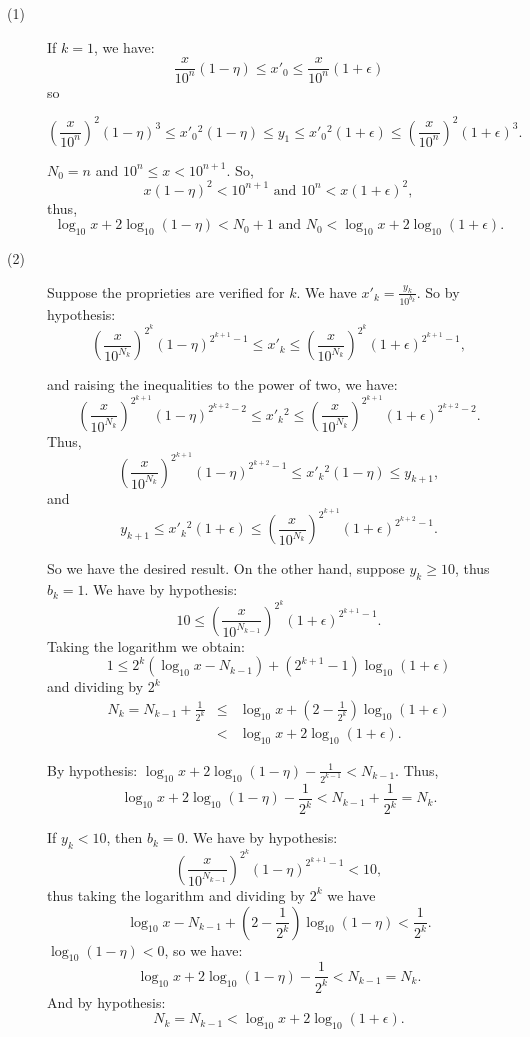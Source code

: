 \documentclass[a4paper,12pt]{article}
\begin{document}
\begin{description}
\item[(1)] If $k = 1$, we have:
\[\frac{x}{10^n}(1-\eta) \le {x'}_0 \le \frac{x}{10^n}(1 + \epsilon)\] so

\[\left(\frac{x}{10^n}\right)^2(1-\eta)^3 \le {x'}_0{}^2(1-\eta) \le y_1
\le {x'}_0{}^2(1+\epsilon)\le \left(\frac{x}{10^n}\right)^2(1+\epsilon)^3.\]

$N_0=n$ and $10^n \le x < 10^{n+1}$.  So,
\[x(1-\eta)^2 < 10^{n+1} \mbox{ and } 10^n < x(1+\epsilon)^2,\] thus,
\[\log_{10}x + 2\log_{10}(1-\eta) < N_0 + 1 \mbox{ and }
N_0 < \log_{10} x + 2 \log_{10}(1 + \epsilon).\]

\item[(2)] Suppose the proprieties are verified for $k$.  We have
${x'}_k = \frac{y_k}{10^{b_k}}$.  So by hypothesis:
\[\left(\frac{x}{10^{N_k}}\right)^{2^k}(1-\eta)^{2^{k+1}-1} \le {x'}_k \le
\left(\frac{x}{10^{N_k}}\right)^{2^k}(1+\epsilon)^{2^{k+1}-1},\]

and raising the inequalities to the power of two, we have:
\[\left(\frac{x}{10^{N_k}}\right)^{2^{k+1}}(1-\eta)^{2^{k+2}-2} \le {x'}_k{}^2 \le
\left(\frac{x}{10^{N_k}}\right)^{2^{k+1}}(1+\epsilon)^{2^{k+2}-2}.\] Thus,
\[\left(\frac{x}{10^{N_k}}\right)^{2^{k+1}}(1-\eta)^{2^{k+2}-1} \le
{x'}_k{}^2(1-\eta) \le y_{k+1},\] and
\[y_{k+1} \le {x'}_k{}^2(1+\epsilon) \le
\left(\frac{x}{10^{N_k}}\right)^{2^{k+1}}(1+\epsilon)^{2^{k+2}-1}.\]

So we have the desired result.  On the other hand, suppose $y_k \ge 10$, thus
$b_k = 1$.  We have by hypothesis:
\[ 10 \le \left(\frac{x}{10^{N_{k-1}}}\right)^{2^k}(1+\epsilon)^{2^{k+1}-1}.\]
Taking the logarithm we obtain:
\[ 1 \le 2^k(\log_{10}x - N_{k-1}) + (2^{k+1}-1)\log_{10}(1+\epsilon)\]
and dividing by $2^k$
\begin{eqnarray*}
N_k = N_{k-1} + \frac{1}{2^k} & \le & \log_{10}x + (2 - \frac{1}{2^k})
\log_{10}(1+\epsilon)\\
& < & \log_{10}x + 2 \log_{10}(1+\epsilon).
\end{eqnarray*}

By hypothesis: $\log_{10}x + 2 \log_{10}(1-\eta) - \frac{1}{2^{k-1}} < N_{k-1}$.
Thus,
\[\log_{10}x + 2 \log_{10}(1-\eta) - \frac{1}{2^k} < N_{k-1} + \frac{1}{2^k}
= N_k.\]

\medskip If $y_k < 10$, then $b_k = 0$.  We have by hypothesis:
\[\left(\frac{x}{10^{N_{k-1}}}\right)^{2^k}(1-\eta)^{2^{k+1}-1} < 10,\]
thus taking the logarithm and dividing by $2^k$ we have
\[\log_{10} x - N_{k-1} + \left(2 - \frac{1}{2^k}\right)\log_{10}(1-\eta)
< \frac{1}{2^k}.\]
$\log_{10}(1-\eta) < 0$, so we have:
\[\log_{10}x + 2 \log_{10}(1-\eta) - \frac{1}{2^k} < N_{k-1} = N_k.\]
And by hypothesis:
\[ N_k = N_{k-1} < \log_{10} x + 2 \log_{10}(1 + \epsilon).\]
\end{description}
\end{document}
